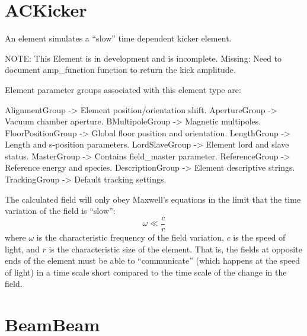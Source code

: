 \newpage

\section{ACKicker}
\label{s:ackicker}

An  element simulates a ``slow'' time dependent kicker element.

NOTE: This Element is in development and is incomplete. 
Missing: Need to document amp_function function to return the kick amplitude.

Element parameter groups associated with this element type are:
\TOPrule 
\begin{example}
  AlignmentGroup     -> Element position/orientation shift.  
  ApertureGroup      -> Vacuum chamber aperture.  
  BMultipoleGroup    -> Magnetic multipoles.  
  FloorPositionGroup -> Global floor position and orientation.  
  LengthGroup        -> Length and s-position parameters.  
  LordSlaveGroup     -> Element lord and slave status.  
  MasterGroup        -> Contains field_master parameter.  
  ReferenceGroup     -> Reference energy and species.  
  DescriptionGroup   -> Element descriptive strings.  
  TrackingGroup      -> Default tracking settings.  
\end{example}
\BOTTOMrule


The calculated field will only obey Maxwell's equations in the limit that the time variation
of the field is ``slow'':
\begin{equation}
  \omega \ll \frac{c}{r}
\end{equation}
where $\omega$ is the characteristic frequency of the field variation, $c$ is the speed of light,
and $r$ is the characteristic size of the  element. That is, the fields at opposite
ends of the element must be able to ``communicate'' (which happens at the speed of light) in a time
scale short compared to the time scale of the change in the field.

\newpage

\section{BeamBeam}
\label{s:beambeam}

